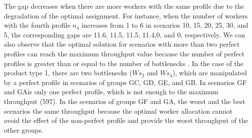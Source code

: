 \documentclass[review,12pt, 3p, times]{elsarticle}
\begin{document}
The gap decreases when there are more workers with the same profile due to the degradation of the optimal assignment. For instance, when the number of workers with the fourth profile $n_4$ increases from 1 to 6 in scenarios 10, 15, 20, 25, 30, and 5, the corresponding gaps are 11.6, 11.5, 11.5, 11.4,0, and 0, respectively. 
We can also observe that the optimal solution for scenarios with more than two perfect profiles can reach the maximum throughput value because the number of perfect profiles is greater than or equal to the number of bottlenecks . In the case of the product  type 1, there are two bottlenecks  ($Ws_2$ and $Ws_4$), which are manipulated by a perfect profile in scenarios of groups GC, GD, GE, and GB. In scenarios GF and GAis only one perfect profile, which is not enough to  the maximum throughput (597). In the scenarios of groups GF and GA, the worst and the best scenarios  the same throughput because the optimal worker allocation cannot avoid the effect of the non-perfect profile and provide the worst throughput of the other groups.
	
\end{document}
